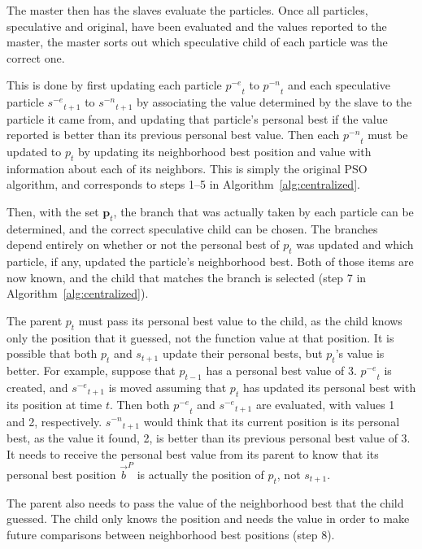 \documentclass[journal,letterpaper]{IEEEtran}
\newcommand{\alg}[1]{Algorithm~\ref{alg:#1}}
\providecommand{\pers}{\ensuremath{P}}
\providecommand{\pbest}{\ensuremath{\Vec{b}^\pers}}
\providecommand{\noeval}[1]{\ensuremath{#1^{-e}}}
\providecommand{\nonbest}[1]{\ensuremath{#1^{-n}}}
\providecommand{\p}{\ensuremath{p}}
\providecommand{\pset}{\ensuremath{\mathbf{p}}}
\providecommand{\s}{\ensuremath{s}}
\begin{document}
The master then has the slaves evaluate the particles.  Once all particles,
speculative and original, have been evaluated and the values reported to the
master, the master sorts out which speculative child of each particle was the
correct one.

This is done by first updating each particle $\noeval{\p}_t$ to
$\nonbest{\p}_t$ and each speculative particle $\noeval{\s}_{t+1}$ to
$\nonbest{\s}_{t+1}$ by associating the value determined by the slave to the
particle it came from, and updating that particle's personal best if the value
reported is better than its previous personal best value.  Then each
$\nonbest{\p}_t$ must be updated to $\p_t$ by updating its neighborhood best
position and value with information about each of its neighbors.  This is
simply the original PSO algorithm, and corresponds to steps 1--5 in
\alg{centralized}.

Then, with the set $\pset_t$, the branch that was actually taken by each
particle can be determined, and the correct speculative child can be chosen.
The branches depend entirely on whether or not the personal best of $p_t$ was
updated and which particle, if any, updated the particle's neighborhood best.
Both of those items are now known, and the child that matches the branch is
selected (step 7 in \alg{centralized}).

The parent $\p_t$ must pass its personal best value to the child, as the child
knows only the position that it guessed, not the function value at that
position.  It is possible that both $\p_t$ and $\s_{t+1}$ update their
personal bests, but $\p_t$'s value is better.  For example, suppose that
$\p_{t-1}$ has a personal best value of 3.  $\noeval{\p}_t$ is created, and
$\noeval{\s}_{t+1}$ is moved assuming that $\p_t$ has updated its personal
best with its position at time $t$.  Then both $\noeval{\p}_t$ and
$\noeval{\s}_{t+1}$ are evaluated, with values 1 and 2, respectively.
$\nonbest{\s}_{t+1}$ would think that its current position is its personal
best, as the value it found, 2, is better than its previous personal best
value of 3.  It needs to receive the personal best value from its parent to
know that its personal best position $\pbest$ is actually the position of
$\p_t$, not $\s_{t+1}$.

The parent also needs to pass the value of the neighborhood best that the child
guessed.  The child only knows the position and needs the value in order to
make future comparisons between neighborhood best positions (step 8).
\end{document}
